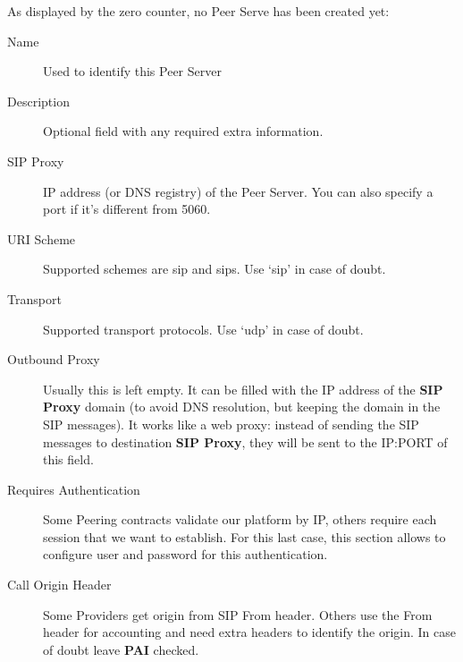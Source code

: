 \documentclass[letterpaper,10pt,english]{sphinxmanual}
\begin{document}
As displayed by the zero counter, no Peer Serve has been created yet:
\begin{description}
\item[{Name}] \leavevmode{}\label{brand/peering/peer_servers:term-name}
Used to identify this Peer Server

\item[{Description}] \leavevmode{}\label{brand/peering/peer_servers:term-description}
Optional field with any required extra information.

\item[{SIP Proxy}] \leavevmode{}\label{brand/peering/peer_servers:term-sip-proxy}
IP address (or DNS registry) of the Peer Server. You can also specify
a port if it's different from 5060.

\item[{URI Scheme}] \leavevmode{}\label{brand/peering/peer_servers:term-uri-scheme}
Supported schemes are sip and sips. Use `sip' in case of doubt.

\item[{Transport}] \leavevmode{}\label{brand/peering/peer_servers:term-transport}
Supported transport protocols. Use `udp' in case of doubt.

\item[{Outbound Proxy}] \leavevmode{}\label{brand/peering/peer_servers:term-outbound-proxy}
Usually this is left empty. It can be filled with the IP address of the
\textbf{SIP Proxy} domain (to avoid DNS resolution, but keeping the domain
in the SIP messages). It works like a web proxy: instead of sending the
SIP messages to destination \textbf{SIP Proxy}, they will be sent to the
IP:PORT of this field.

\item[{Requires Authentication}] \leavevmode{}\label{brand/peering/peer_servers:term-requires-authentication}
Some Peering contracts validate our platform by IP, others require
each session that we want to establish. For this last case, this section
allows to configure user and password for this authentication.

\item[{Call Origin Header}] \leavevmode{}\label{brand/peering/peer_servers:term-call-origin-header}
Some Providers get origin from SIP From header. Others use the From
header for accounting and need extra headers to identify the origin.
In case of doubt leave \textbf{PAI} checked.


\end{description}
\end{document}

